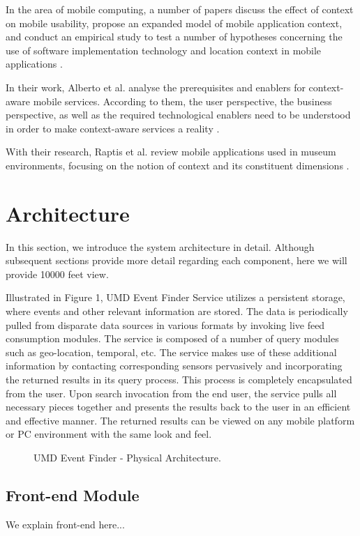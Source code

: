 \documentclass{acm_proc_article-sp}
\begin{document}
In the area of mobile computing, a number of papers discuss the effect of context on mobile usability, propose an expanded model of mobile application context, and conduct an empirical study to test a number of hypotheses concerning the use of software implementation technology and location context in mobile applications \cite{ryan:mobile}.

In their work, Alberto et al. analyse the prerequisites and enablers for context-aware mobile services. According to them,  the user perspective, the business perspective, as well as the required technological enablers need to be understood in order to make context-aware services a reality \cite{alberto:usercentric}.

With their research, Raptis et al. review mobile applications used in museum environments, focusing on the notion of context and its constituent dimensions \cite{raptis:museum}.

\section{Architecture}
In this section, we introduce the system architecture in detail. Although subsequent sections provide more detail regarding each component, here we will provide 10000 feet view.

Illustrated in Figure 1, UMD Event Finder Service utilizes a persistent storage, where events and other relevant information are stored. The data is periodically pulled from disparate data sources in various formats by invoking live feed consumption modules. The service is composed of a number of query modules such as geo-location, temporal, etc. The service makes use of these additional information by contacting corresponding sensors pervasively and incorporating the returned results in its query process. This process is completely encapsulated from the user. Upon search invocation from the end user, the service pulls all necessary pieces together and presents the results back to the user in an efficient and effective manner. The returned results can be viewed on any mobile platform or PC environment with the same look and feel.

\begin{figure*}
\centering
{}
\caption{UMD Event Finder - Physical Architecture.}
\end{figure*}

\subsection{Front-end Module}	 
We explain front-end here...
\end{document}
